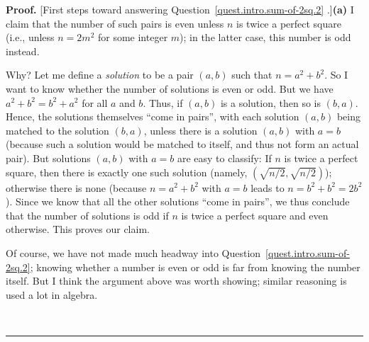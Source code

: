 \documentclass[numbers=enddot,12pt,final,onecolumn,notitlepage]{scrartcl}%
\numberwithin{exer}{section}
\theoremstyle{definition}
\newenvironment{proof}[1][Proof]{\noindent\textbf{#1.} }{\ \rule{0.5em}{0.5em}}
\begin{document}
\begin{proof}
[First steps toward answering Question~\ref{quest.intro.sum-of-2sq.2}%
.]\textbf{(a)} I claim that the number of such pairs is even unless $n$ is
twice a perfect square (i.e., unless $n = 2m^{2}$ for some integer $m$); in
the latter case, this number is odd instead.

Why? Let me define a \textit{solution} to be a pair $\left(  a, b \right)  $
such that $n = a^{2} + b^{2}$. So I want to know whether the number of
solutions is even or odd. But we have $a^{2} + b^{2} = b^{2} + a^{2}$ for all
$a$ and $b$. Thus, if $\left(  a, b \right)  $ is a solution, then so is
$\left(  b, a \right)  $. Hence, the solutions themselves ``come in pairs'',
with each solution $\left(  a, b \right)  $ being matched to the solution
$\left(  b, a \right)  $, unless there is a solution $\left(  a, b \right)  $
with $a = b$ (because such a solution would be matched to itself, and thus not
form an actual pair). But solutions $\left(  a, b \right)  $ with $a = b$ are
easy to classify: If $n$ is twice a perfect square, then there is exactly one
such solution (namely, $\left(  \sqrt{n/2}, \sqrt{n/2} \right)  $); otherwise
there is none (because $n = a^{2} + b^{2}$ with $a = b$ leads to $n = b^{2} +
b^{2} = 2b^{2}$). Since we know that all the other solutions ``come in
pairs'', we thus conclude that the number of solutions is odd if $n$ is twice
a perfect square and even otherwise. This proves our claim.

Of course, we have not made much headway into
Question~\ref{quest.intro.sum-of-2sq.2}; knowing whether a number is even or
odd is far from knowing the number itself. But I think the argument above was
worth showing; similar reasoning is used a lot in algebra.


\end{proof}
\end{document}

